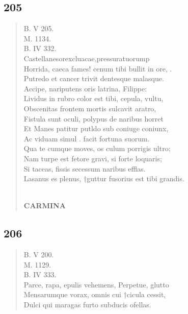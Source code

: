 \documentclass[11pt, a4paper]{report}
\begin{document}
            \subsection*{205}
      \begin{verse}
      B. V 205. \\ M. 1134. \\ B. IV 332. \\ Castellanesorexcluacae,pressuratuorump \\ Horrida, caeca fames! cenum tibi bullit in ore, . \\ Putredo et cancer trivit dentesque malasque. \\ Accipe, nariputens oris latrina, Filippe: \\ Lividus in rubro color est tibi, cepula, vultu, \\ Obscenitas frontem mortis sulcavit aratro, \\ Fistula sunt oculi, polypus de naribus horret \\ Et Manes patitur putldo sub coniuge coniunx, \\ Ac viduam simul . facit fortuna suorum. \\ Qua te cumque moves, os culum porrigis ultro; \\ Nam turpe est fetore gravi, si forte loquaris; \\ Si taceas, fissis secessum naribus efflas. \\ Lasanus es plenus, †guttur fusorius est tibi grandis. \\ 
        ﻿\pagebreak 
     \marginpar{[178]} \begin{center} \textbf{CARMINA} \end{center}
      \end{verse}
  
            \subsection*{206}
      \begin{verse}
      B. V 200. \\ M. 1129. \\ B. IV 333. \\ Parce, rapa, epulis vehemens, Perpetue, glutto \\ Mensarumque vorax, omnis cui †cicula cessit, \\ Dulci qui maragas furto subducis ofellas. \\ 
      \end{verse}
  
\end{document}
